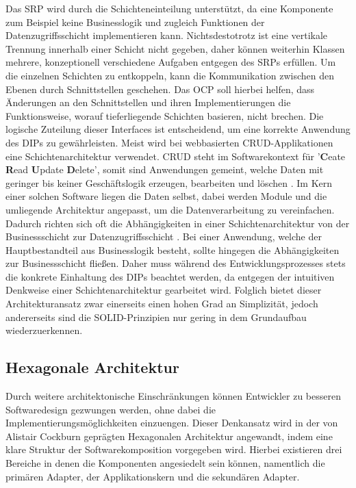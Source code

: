 Das \acrlong{SRP} wird durch die Schichteneinteilung unterstützt, da eine Komponente zum Beispiel keine Businesslogik und zugleich Funktionen der Datenzugriffsschicht implementieren kann. Nichtsdestotrotz ist eine vertikale Trennung innerhalb einer Schicht nicht gegeben, daher können weiterhin Klassen mehrere, konzeptionell verschiedene Aufgaben entgegen des SRPs erfüllen. Um die einzelnen Schichten zu entkoppeln, kann die Kommunikation zwischen den Ebenen durch Schnittstellen geschehen. Das \acrlong{OCP} soll hierbei helfen, dass Änderungen an den Schnittstellen und ihren Implementierungen die Funktionsweise, worauf tieferliegende Schichten basieren, nicht brechen. Die logische Zuteilung dieser Interfaces ist entscheidend, um eine korrekte Anwendung des \acrlong{DIP}s zu gewährleisten. Meist wird bei webbasierten CRUD-Applikationen eine Schichtenarchitektur verwendet. \acrshort{CRUD} steht im Softwarekontext für '\textbf{C}eate \textbf{R}ead \textbf{U}pdate \textbf{D}elete', somit sind Anwendungen gemeint, welche Daten mit geringer bis keiner Geschäftslogik erzeugen, bearbeiten und löschen \cite[S. 381]{Martin.1980}. Im Kern einer solchen Software liegen die Daten selbst, dabei werden Module und die umliegende Architektur angepasst, um die Datenverarbeitung zu vereinfachen. Dadurch richten sich oft die Abhängigkeiten in einer Schichtenarchitektur von der Businessschicht zur Datenzugriffsschicht \cite{Layered.SOLID}. Bei einer Anwendung, welche der Hauptbestandteil aus Businesslogik besteht, sollte hingegen die Abhängigkeiten zur Businessschicht fließen. Daher muss während des Entwicklungsprozesses stets die konkrete Einhaltung des DIPs beachtet werden, da entgegen der intuitiven Denkweise einer Schichtenarchitektur gearbeitet wird. Folglich bietet dieser Architekturansatz zwar einerseits einen hohen Grad an Simplizität, jedoch andererseits sind die SOLID-Prinzipien nur gering in dem Grundaufbau wiederzuerkennen.

\subsection{Hexagonale Architektur}

Durch weitere architektonische Einschränkungen können Entwickler zu besseren Softwaredesign gezwungen werden, ohne dabei die Implementierungsmöglichkeiten einzuengen. Dieser Denkansatz wird in der von Alistair Cockburn geprägten Hexagonalen Architektur angewandt, indem eine klare Struktur der Softwarekomposition vorgegeben wird. Hierbei existieren drei Bereiche in denen die Komponenten angesiedelt sein können, namentlich die primären Adapter, der Applikationskern und die sekundären Adapter. \cite{Cockburn.Hexagonal}  

